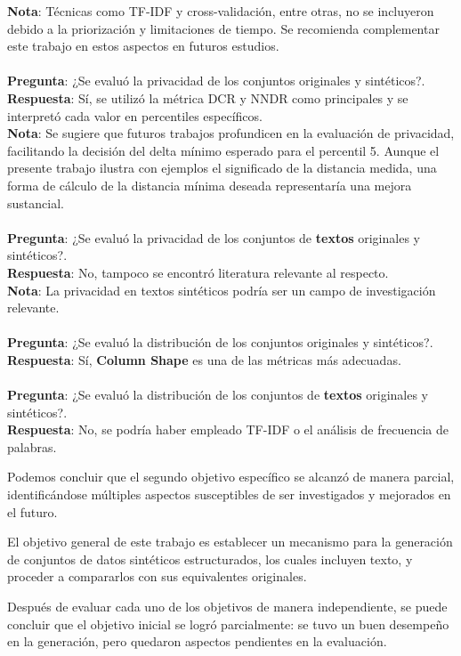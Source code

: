 \textbf{Nota}: Técnicas como TF-IDF y cross-validación, entre otras, no se incluyeron debido a la priorización y limitaciones de tiempo. Se recomienda complementar este trabajo en estos aspectos en futuros estudios. \textcolor{orange}{\faExclamationTriangle}
\\
\\
\textbf{Pregunta}: ¿Se evaluó la privacidad de los conjuntos originales y sintéticos?. \\
\textbf{Respuesta}: Sí, se utilizó la métrica DCR y NNDR como principales y se interpretó cada valor en percentiles específicos. \textcolor{green}{} \\
\textbf{Nota}: Se sugiere que futuros trabajos profundicen en la evaluación de privacidad, facilitando la decisión del delta mínimo esperado para el percentil 5. Aunque el presente trabajo ilustra con ejemplos el significado de la distancia medida, una forma de cálculo de la distancia mínima deseada representaría una mejora sustancial. \textcolor{orange}{\faExclamationTriangle}
\\
\\
\textbf{Pregunta}: ¿Se evaluó la privacidad de los conjuntos de \textbf{textos} originales y sintéticos?. \\
\textbf{Respuesta}: No, tampoco se encontró literatura relevante al respecto. \\
\textbf{Nota}: La privacidad en textos sintéticos podría ser un campo de investigación relevante. \textcolor{orange}{\faExclamationTriangle}
\\
\\
\textbf{Pregunta}: ¿Se evaluó la distribución de los conjuntos originales y sintéticos?. \\
\textbf{Respuesta}: Sí, \textbf{Column Shape} es una de las métricas más adecuadas. \textcolor{green}{}
\\
\\
\textbf{Pregunta}: ¿Se evaluó la distribución de los conjuntos de \textbf{textos} originales y sintéticos?. \\
\textbf{Respuesta}: No, se podría haber empleado TF-IDF o el análisis de frecuencia de palabras. \textcolor{red}{}

Podemos concluir que el segundo objetivo específico se alcanzó de manera parcial, identificándose múltiples aspectos susceptibles de ser investigados y mejorados en el futuro. \textcolor{green}{} \textcolor{orange}{\faExclamationTriangle}
\newpage
    

\newpage
\begin{tcolorbox}[colback=white,colframe=black!50!white,title=Objetivo general]
El objetivo general de este trabajo es establecer un mecanismo para la generación de conjuntos de datos sintéticos estructurados, los cuales incluyen texto, y proceder a compararlos con sus equivalentes originales.
\end{tcolorbox}
Después de evaluar cada uno de los objetivos de manera independiente, se puede concluir que el objetivo inicial se logró parcialmente: se tuvo un buen desempeño en la generación, pero quedaron aspectos pendientes en la evaluación.

